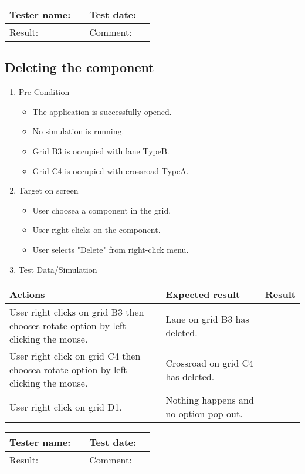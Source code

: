 \begin{tabularx}{\textwidth}{|p{3cm}X|p{3cm}X|}\hline
	Tester name: &  & Test date: & \\\hline
	Result: &   \pass & Comment: & \\\hline
\end{tabularx}

\newpage

\subsection{Deleting the component}

\begin{enumerate}
	\item Pre-Condition
	\begin{itemize}
		\item The application is successfully opened.
		\item No simulation is running.
		\item Grid B3 is occupied with lane TypeB.
		\item Grid C4 is occupied with crossroad TypeA.
	\end{itemize}
	\item Target on screen
	\begin{itemize}
		\item User choosea a component in the grid.
		\item User right clicks on the component.
		\item User selects "Delete" from right-click menu.
	\end{itemize}
	\item Test Data/Simulation
\end{enumerate}	
	\begin{tabularx}{\textwidth}{|X|X|p{2.5cm}|}\hline
		Actions & Expected result & Result \\\hline
		User right clicks on grid B3 then chooses rotate option by left clicking the mouse.  & Lane on grid B3 has deleted.  & \pass \\\hline
		User right click on grid C4 then choosea rotate option by left clicking the mouse. & Crossroad on grid C4 has deleted. & \pass \\\hline
		User right click on grid D1. & Nothing happens and no option pop out. & \pass \\\hline
	\end{tabularx}
	


\begin{tabularx}{\textwidth}{|p{3cm}X|p{3cm}X|}\hline
	Tester name: &  & Test date: & \\\hline
	Result: &   \pass & Comment: & \\\hline
\end{tabularx}

